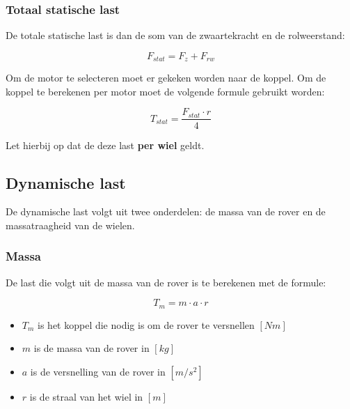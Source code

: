 \documentclass{article}
\begin{document}
            \subsubsection*{Totaal statische last}
                De totale statische last is dan de som van de zwaartekracht en de rolweerstand:

                \begin{equation}
                    F_{stat} = F_{z} + F_{rw}
                \end{equation}

                Om de motor te selecteren moet er gekeken worden naar de koppel. 
                Om de koppel te berekenen per motor moet de volgende formule gebruikt worden:

                \begin{equation}
                    T_{stat} = \frac{F_{stat} \cdot r}{4}
                \end{equation}

                Let hierbij op dat de deze last \textbf{per wiel} geldt.



        \subsection{Dynamische last}
            De dynamische last volgt uit twee onderdelen: de massa van de rover en de massatraagheid van de wielen.
            
            \subsubsection*{Massa}
                De last die volgt uit de massa van de rover is te berekenen met de formule:

                \begin{equation}
                    T_{m} = m \cdot a \cdot r
                \end{equation}

                \begin{itemize}
                    \item $T_{m}$ is het koppel die nodig is om de rover te versnellen $[Nm]$
                    \item $m$ is de massa van de rover in $[kg]$
                    \item $a$ is de versnelling van de rover in $[m/s^2]$
                    \item $r$ is de straal van het wiel in $[m]$
                \end{itemize}
                
\end{document}
